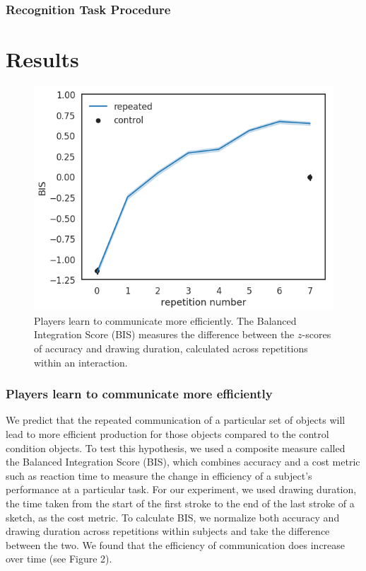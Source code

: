 \documentclass[10pt,letterpaper]{article}
\begin{document}


\subsubsection{Recognition Task Procedure}

\section{Results}

\begin{figure}
\includegraphics[width=\linewidth]{figures/fig_2.png}
\caption{Players learn to communicate more efficiently. The Balanced Integration Score (BIS) measures the difference between the $z$-scores of accuracy and drawing duration, calculated across repetitions within an interaction.} \label{fig:1a}
\end{figure}

\subsubsection{Players learn to communicate more efficiently} We predict that the repeated communication of a particular set of objects will lead to more efficient production for those objects compared to the control condition objects. To test this hypothesis, we used a composite measure called the Balanced Integration Score (BIS), which combines accuracy and a cost metric such as reaction time to measure the change in efficiency of a subject's performance at a particular task. For our experiment, we used drawing duration, the time taken from the start of the first stroke to the end of the last stroke of a sketch, as the cost metric. To calculate BIS, we normalize both accuracy and drawing duration across repetitions within subjects and take the difference between the two. We found that the efficiency of communication does increase over time (see Figure 2). 
\end{document}
